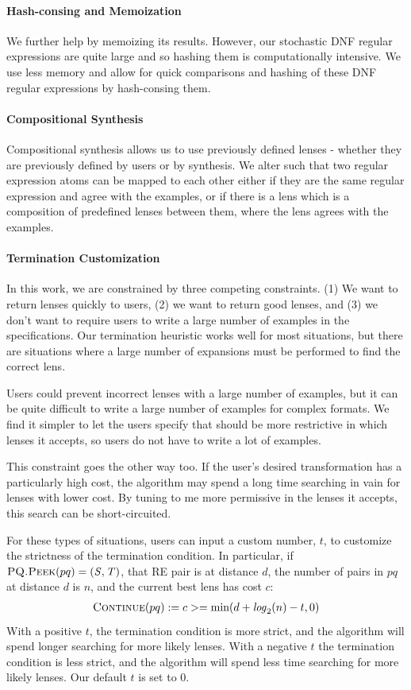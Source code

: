 \documentclass[acmsmall,screen,anonymous]{acmart}
\begin{document}
\paragraph*{Hash-consing and Memoization} We further help \GreedySynth by
memoizing its results.  However, our stochastic DNF regular expressions are
quite large and so hashing them is computationally intensive.  We use less
memory and allow for quick comparisons and hashing of these DNF regular
expressions by hash-consing them.

\paragraph*{Compositional Synthesis} Compositional synthesis allows us to use
previously defined lenses - whether they are previously defined by users or by
synthesis. We alter \GreedySynth such that two regular expression atoms can be
mapped to each other either if they are the same regular expression and agree
with the examples, or if there is a lens which is a composition of predefined
lenses between them, where the lens agrees with the examples.

\paragraph*{Termination Customization}
In this work, we are constrained by three competing constraints. (1) We want to
return lenses quickly to users, (2) we want to return good lenses, and (3) we
don't want to require users to write a large number of examples in the
specifications. Our termination heuristic works well for most situations, but
there are situations where a large number of expansions must be performed to
find the correct lens.

Users could prevent incorrect lenses with a large number of examples, but it can
be quite difficult to write a large number of examples for complex formats. We
find it simpler to let the users specify that \RXSearch should be more
restrictive in which lenses it accepts, so users do not have to write a lot of
examples.

This constraint goes the other way too. If the user's desired transformation has
a particularly high cost, the algorithm may spend a long time searching in vain
for lenses with lower cost. By tuning \RXSearch to me more permissive in the
lenses it accepts, this search can be short-circuited.

For these types of situations, users can input a custom number, $t$, to
customize the strictness of the termination condition. In particular, if
$\PCF{PQ.Peek}(pq) = (\Regex,\RegexAlt)$, that RE pair is at distance $d$, the
number of pairs in $pq$ at distance $d$ is $n$, and the current best lens has
cost $c$:
\begin{gather*}
  \Call{Continue}{pq} := c >= \Min(d + \Log_2(n) - t, 0)
\end{gather*}
With a positive $t$, the termination condition is more strict, and the algorithm
will spend longer searching for more likely lenses. With a negative $t$ the
termination condition is less strict, and the algorithm will spend less time
searching for more likely lenses.  Our default $t$ is set to $0$.
\end{document}
